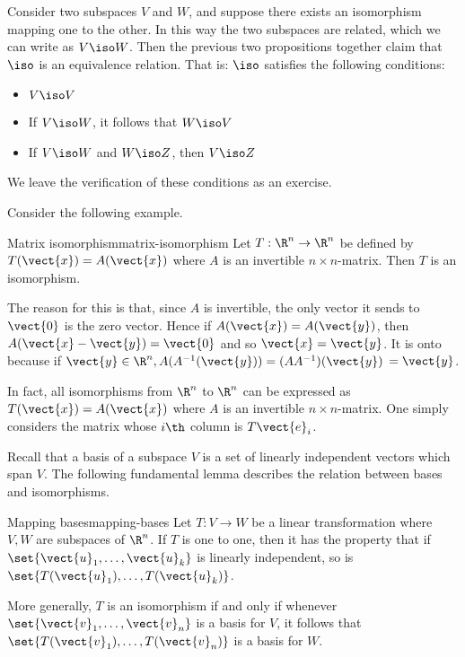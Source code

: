 Consider two subspaces $V$ and $W$, and suppose there exists an isomorphism mapping one to the other. In this way the two subspaces are related, which we can write as $V\iso W$. Then the previous two propositions together claim that $\iso$ is an equivalence relation. That is: $\iso$
satisfies the following conditions:

\begin{itemize}
\item $V\iso V$

\item If $V\iso W$, it follows that $W\iso V$

\item If $V\iso W$ and $W\iso Z$, then $V\iso Z$
\end{itemize}

We leave the verification of these conditions as an exercise.

Consider the following example.

\begin{example}{Matrix isomorphism}{matrix-isomorphism}
Let $T:\R^{n}\rightarrow \R^{n}$ be defined by $T(\vect{x}) = A(\vect{x})$ where $A$ is an invertible $n\times n$-matrix. Then $T$ is
an isomorphism.
\end{example}

\begin{solution}
The reason for this is that, since $A$ is invertible, the only vector it
sends to $\vect{0}$ is the zero vector. Hence if $A(\vect{x})=A(\vect{y})$, then $A(\vect{x}-\vect{y}) =\vect{0}$ and so $\vect{x}=\vect{y}$. It is onto
because if $\vect{y}\in \R^{n},A(A^{-1} (\vect{y})) =(
AA^{-1}) (\vect{y})$ $=\vect{y}$.
\end{solution}

In fact, all isomorphisms from $\R^{n}$ to $\R^{n}$ can be expressed as $T(\vect{x}) = A(\vect{x})$ where $A$ is an invertible $n \times n$-matrix. One
simply considers the matrix whose $i\th$ column is $T\vect{e}_{i}$.

Recall that a basis of a subspace $V$ is a set of linearly independent vectors which span $V$. The following fundamental lemma describes the relation between bases and
isomorphisms.

\begin{lemma}{Mapping bases}{mapping-bases}
Let $T:V\rightarrow W$ be a linear transformation where $V,W$ are
subspaces of $\R^n$. If $T$ is one to one, then it has the property that if $\set{\vect{u}_{1},\ldots,\vect{u}_{k}} $ is linearly independent, so is $\set{T(\vect{u}_{1}),\ldots,T(\vect{u}_{k})}$.

More generally, $T$ is an isomorphism if and only if whenever $\set{
\vect{v}_{1},\ldots,\vect{v}_{n}} $ is a basis for $V$, it follows that $\set{T
(\vect{v}_{1}),\ldots,T(\vect{v}_{n})} $ is a basis for $W$.
\end{lemma}

